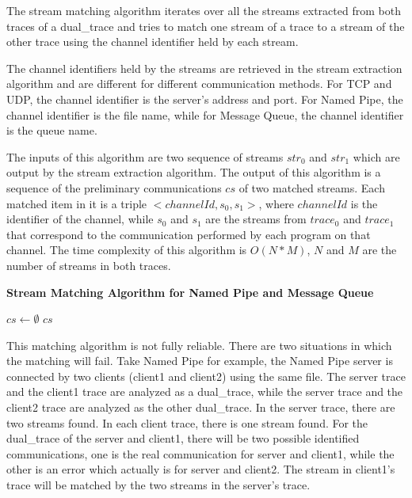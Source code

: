 The stream matching algorithm iterates over all the streams extracted from both traces of a dual\_trace and tries to match one stream of a trace to a stream of the other trace using the channel identifier held by each stream.

The channel identifiers held by the streams are retrieved in the stream extraction algorithm and are different for different communication methods. For TCP and UDP, the channel identifier is the server's address and port. For Named Pipe, the channel identifier is the file name, while for Message Queue, the channel identifier is the queue name.  

 The inputs of this algorithm are two sequence of streams $str_0$ and $str_1$ which are output by the stream extraction algorithm. The output of this algorithm is a sequence of the preliminary communications $cs$ of two matched streams. Each matched item in it is a triple $<channelId, s_0, s_1>$, where $channelId$ is the identifier of the channel, while $s_0$ and $s_1$ are the streams from $trace_0$ and $trace_1$ that correspond to the communication performed by each program on that channel. The time complexity of this algorithm is $O(N*M)$, $N$ and $M$ are the number of streams in both traces.
 
 \begin{algorithm}[H]
\DontPrintSemicolon
\caption{{\bf Stream Matching Algorithm for Named Pipe and Message Queue} \label{matchAlg}}
$cs \leftarrow \emptyset$\; 
\KwRet $cs$\;
\end{algorithm} 

This matching algorithm is not fully reliable. There are two situations in which the matching will fail. Take Named Pipe for example, the Named Pipe server is connected by two clients (client1 and client2) using the same file. The server trace and the client1 trace are analyzed as a dual\_trace, while the server trace and the client2 trace are analyzed as the other dual\_trace. In the server trace, there are two streams found. In each client trace, there is one stream found. For the dual\_trace of the server and client1, there will be two possible identified communications, one is the real communication for server and client1, while the other is an error which actually is for server and client2. The stream in client1's trace will be matched by the two streams in the server's trace. 

